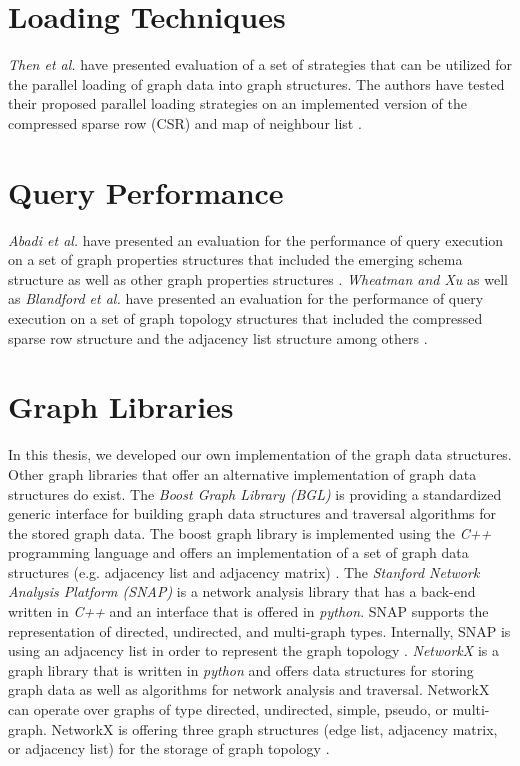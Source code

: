 {\section{Loading Techniques}
\label{sec:relatedWork-loading}

\textit{Then et al.} have presented evaluation of a set of strategies that can be utilized for the parallel loading of graph data into graph structures. The authors have tested their proposed parallel loading strategies on an implemented version of the compressed sparse row (CSR) and map of neighbour list \cite{then2016evaluation}.

\section{Query Performance}
\label{sec:relatedWork-query}

\textit{Abadi et al.} have presented an evaluation for the performance of query execution on a set of graph properties structures that included the emerging schema structure as well as other graph properties structures \cite{abadi2007scalable}. \textit{Wheatman and Xu} as well as \textit{Blandford et al.} have presented an evaluation for the performance of query execution on a set of graph topology structures that included the compressed sparse row structure and the adjacency list structure among others \cite{wheatmanpacked,blandford2004experimental}.


\section{Graph Libraries}
\label{sec:relatedWork-graphLibraries}

In this thesis, we developed our own implementation of the graph data structures. Other graph libraries that offer an alternative implementation of graph data structures do exist. The \textit{Boost Graph Library (BGL)} is providing a standardized generic interface for building graph data structures and traversal algorithms for the stored graph data. The boost graph library is implemented using the \textit{C++} programming language and offers an implementation of a set of graph data structures (e.g. adjacency list and adjacency matrix) \cite{boostGraphLibrary2001}. The \textit{Stanford Network Analysis Platform (SNAP)} is a network analysis library that has a back-end written in \textit{C++} and an interface that is offered in \textit{python}. SNAP supports the representation of directed, undirected, and multi-graph types. Internally, SNAP is using an adjacency list in order to represent the graph topology \cite{leskovec2016snap}. \textit{NetworkX} is a graph library that is written in \textit{python} and offers data structures for storing graph data as well as algorithms for network analysis and traversal. NetworkX can operate over graphs of type directed, undirected, simple, pseudo, or multi-graph. NetworkX is offering three graph structures (edge list, adjacency matrix, or adjacency list) for the storage of graph topology \cite{SciPyProceedings_11}.


}